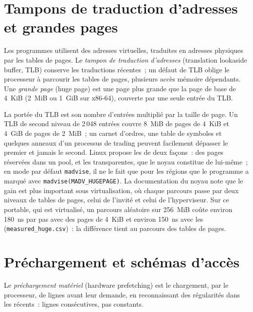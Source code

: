 \section{Tampons de traduction d'adresses et grandes pages}

\begin{definition}\label{def:ll:memory-hierarchy-and-caches:tlb}
Les programmes utilisent des adresses virtuelles, traduites en adresses physiques par les tables de pages. Le \emph{tampon de traduction
d'adresses} (translation lookaside buffer, TLB) conserve les traductions récentes~; un défaut de TLB oblige le processeur à parcourir les
tables de pages, plusieurs accès mémoire dépendants. Une \emph{grande page} (huge page) est une page plus grande que la page
de base de 4~KiB (2~MiB ou 1~GiB sur x86-64), couverte par une seule entrée du TLB.
\end{definition}

La portée du TLB est son nombre d'entrées multiplié par la taille de page. Un TLB de second niveau de 2\,048 entrées couvre 8~MiB de
pages de 4~KiB et 4~GiB de pages de 2~MiB~; un carnet d'ordres, une table de symboles et quelques anneaux d'un processus de trading peuvent facilement
dépasser le premier et jamais le second. Linux propose les  de deux façons~: des pages réservées dans un pool, et les  transparentes,
que le noyau constitue de lui-même~; en mode par défaut \texttt{madvise}, il ne le fait que pour les régions que le
programme a marqué avec \texttt{madvise(MADV\_HUGEPAGE)}. La documentation du noyau note que le gain est plus important
sous virtualisation, où chaque parcours passe par deux niveaux de tables de pages, celui de l'invité et celui de l'hyperviseur. Sur
ce portable, qui est virtualisé, un parcours aléatoire sur 256~MiB coûte environ \qty{180}{\nano\second} par pas avec des pages
de 4~KiB et environ \qty{150}{\nano\second} avec les  (\texttt{measured\_huge.csv})~: la différence tient
au parcours des tables de pages.


\section{Préchargement et schémas d'accès}

\begin{definition}\label{def:ll:memory-hierarchy-and-caches:prefetch}
Le \emph{préchargement matériel} (hardware prefetching) est le chargement, par le processeur, de lignes avant leur demande,
en reconnaissant des régularités dans les  récents~: lignes consécutives, pas constants.
\end{definition}

